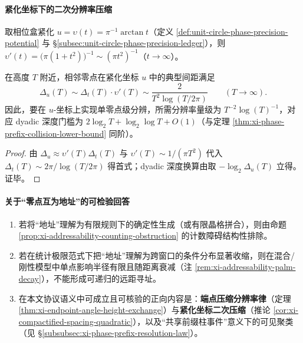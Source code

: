 \paragraph{紧化坐标下的二次分辨率压缩}
取相位盒紧化 \(u=\upsilon(t)=\pi^{-1}\arctan t\)（定义 \ref{def:unit-circle-phase-precision-potential} 与 \S\ref{subsec:unit-circle-phase-precision-ledger}），则
\(
\upsilon'(t)=\bigl(\pi(1+t^2)\bigr)^{-1}\sim (\pi t^2)^{-1}
\)（\(t\to\infty\)）。
\begin{corollary}[紧化坐标的二次分辨率压缩律]\label{cor:xi-compactified-spacing-quadratic}
在高度 \(T\) 附近，相邻零点在紧化坐标 \(u\) 中的典型间距满足
\[
\Delta_u(T)\sim \Delta_t(T)\cdot \upsilon'(T)\sim \frac{2}{T^2\log(T/2\pi)}
\qquad(T\to\infty).
\]
因此，要在 \(u\)-坐标上实现单零点级分辨，所需分辨率量级为 \(T^{-2}\log(T)^{-1}\)，对应 dyadic 深度门槛为 \(2\log_2 T+\log_2\log T+O(1)\)（与定理 \ref{thm:xi-phase-prefix-collision-lower-bound} 同阶）。
\end{corollary}
\begin{proof}
由 \(\Delta_u\approx \upsilon'(T)\Delta_t(T)\) 与 \(\upsilon'(T)\sim 1/(\pi T^2)\) 代入 \(\Delta_t(T)\sim 2\pi/\log(T/2\pi)\) 得首式；dyadic 深度换算由取 \(-\log_2\Delta_u(T)\) 立得。证毕。
\end{proof}

\paragraph{关于“零点互为地址”的可检验回答}
\begin{enumerate}
  \item 若将“地址”理解为有限规则下的确定性生成（或有限晶格拼合），则由命题 \ref{prop:xi-addressability-counting-obstruction} 的计数障碍结构性排除。
  \item 若在统计极限范式下把“地址”理解为跨窗口的条件分布显著收缩，则在混合/刚性模型中单点影响半径有限且随距离衰减（注 \ref{rem:xi-addressability-palm-decay}），不能形成可递归的远距寻址。
  \item 在本文协议语义中可成立且可核验的正向内容是：\textbf{端点压缩分辨率律}（定理 \ref{thm:xi-endpoint-angle-height-exchange}）与\textbf{紧化坐标二次压缩}（推论 \ref{cor:xi-compactified-spacing-quadratic}），以及“共享前缀柱事件”意义下的可见聚类（见 \S\ref{subsubsec:xi-phase-prefix-resolution-law}）。
\end{enumerate}

\endinput
